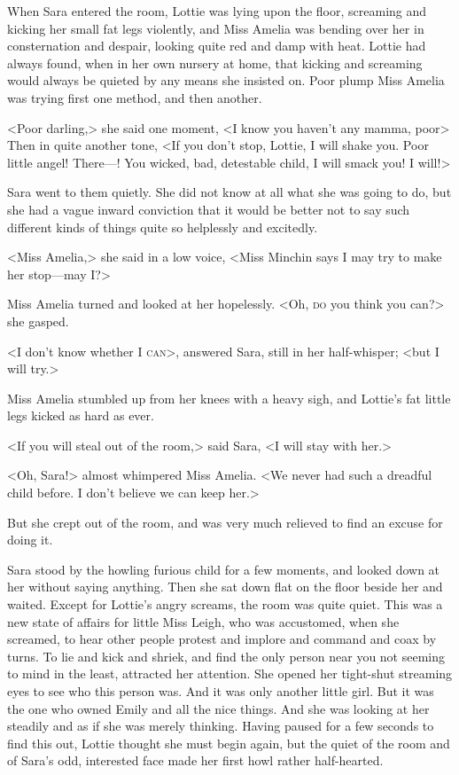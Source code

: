 When Sara entered the room, Lottie was lying upon the floor, screaming and kicking her small fat legs violently, and Miss Amelia was bending over her in consternation and despair, looking quite red and damp with heat. Lottie had always found, when in her own nursery at home, that kicking and screaming would always be quieted by any means she insisted on. Poor plump Miss Amelia was trying first one method, and then another.

<Poor darling,> she said one moment, <I know you haven't any mamma, poor\longdash> Then in quite another tone, <If you don't stop, Lottie, I will shake you. Poor little angel! There—! You wicked, bad, detestable child, I will smack you! I will!>

Sara went to them quietly. She did not know at all what she was going to do, but she had a vague inward conviction that it would be better not to say such different kinds of things quite so helplessly and excitedly.

<Miss Amelia,> she said in a low voice, <Miss Minchin says I may try to make her stop—may I\@?>

Miss Amelia turned and looked at her hopelessly. <Oh, \textsc{do} you think you can?> she gasped.

<I don't know whether I \textsc{can}>, answered Sara, still in her half-whisper; <but I will try.>

Miss Amelia stumbled up from her knees with a heavy sigh, and Lottie's fat little legs kicked as hard as ever.

<If you will steal out of the room,> said Sara, <I will stay with her.>

<Oh, Sara!> almost whimpered Miss Amelia. <We never had such a dreadful child before. I don't believe we can keep her.>

But she crept out of the room, and was very much relieved to find an excuse for doing it.

Sara stood by the howling furious child for a few moments, and looked down at her without saying anything. Then she sat down flat on the floor beside her and waited. Except for Lottie's angry screams, the room was quite quiet. This was a new state of affairs for little Miss Leigh, who was accustomed, when she screamed, to hear other people protest and implore and command and coax by turns. To lie and kick and shriek, and find the only person near you not seeming to mind in the least, attracted her attention. She opened her tight-shut streaming eyes to see who this person was. And it was only another little girl. But it was the one who owned Emily and all the nice things. And she was looking at her steadily and as if she was merely thinking. Having paused for a few seconds to find this out, Lottie thought she must begin again, but the quiet of the room and of Sara's odd, interested face made her first howl rather half-hearted.

